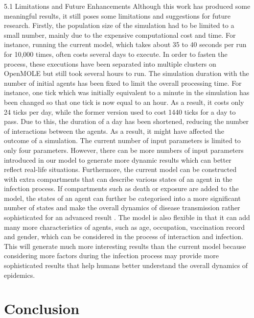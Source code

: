 \documentclass[smallextended]{svjour3}       %
\begin{document}
5.1 Limitations and Future Enhancements
Although this work has produced some meaningful results, it still poses some limitations and suggestions for future research. Firstly, the population size of the simulation had to be limited to a small number, mainly due to the expensive computational cost and time. For instance, running the current model, which takes about 35 to 40 seconds per run for 10,000 times, often costs several days to execute. In order to fasten the process, these executions have been separated into multiple clusters on OpenMOLE but still took several hours to run. The simulation duration with the number of initial agents has been fixed to limit the overall processing time. For instance, one tick which was initially equivalent to a minute in the simulation has been changed so that one tick is now equal to an hour. As a result, it costs only 24 ticks per day, while the former version used to cost 1440 ticks for a day to pass. Due to this, the duration of a day has been shortened, reducing the number of interactions between the agents. As a result, it might have affected the outcome of a simulation.
The current number of input parameters is limited to only four parameters. However, there can be more numbers of input parameters introduced in our model to generate more dynamic results which can better reflect real-life situations. Furthermore, the current model can be constructed with extra compartments that can describe various states of an agent in the infection process. If compartments such as death or exposure are added to the model, the states of an agent can further be categorised into a more significant number of states and make the overall dynamics of disease transmission rather sophisticated for an advanced result \cite{reyne2022principles}. The model is also flexible in that it can add many more characteristics of agents, such as age, occupation, vaccination record and gender, which can be considered in the process of interaction and infection. This will generate much more interesting results than the current model because considering more factors during the infection process may provide more sophisticated results that help humans better understand the overall dynamics of epidemics.



\section{Conclusion}
\end{document}

